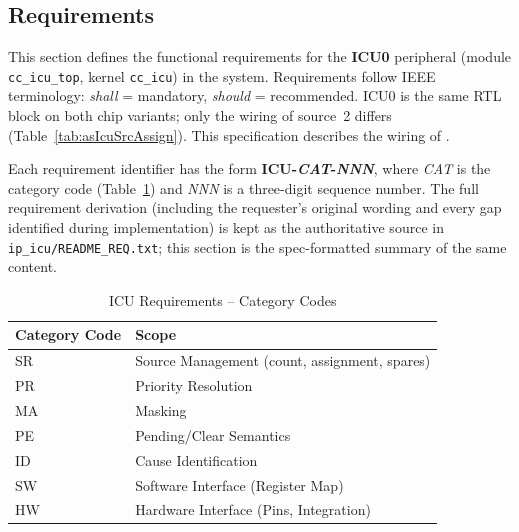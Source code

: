 
\label{sec:icufunc01}

\subsection{Requirements}
\label{subsec:icureq01}

This section defines the functional requirements for the \textbf{ICU0}
peripheral (module \texttt{cc\_icu\_top}, kernel \texttt{cc\_icu}) in the
\aschip{} system. Requirements follow IEEE terminology:
\textit{shall} = mandatory, \textit{should} = recommended.
ICU0 is the same RTL block on both chip variants; only the wiring of
source~2 differs (Table~\ref{tab:asIcuSrcAssign}). This specification
describes the wiring of \asvariant.

Each requirement identifier has the form \textbf{ICU-\textit{CAT}-\textit{NNN}},
where \textit{CAT} is the category code (Table~\ref{tab:asIcuReqCat}) and
\textit{NNN} is a three-digit sequence number. The full requirement
derivation (including the requester's original wording and every gap
identified during implementation) is kept as the authoritative source in
\texttt{ip\_icu/README\_REQ.txt}; this section is the spec-formatted
summary of the same content.

\begin{table}[H]
\caption{ICU Requirements -- Category Codes}
\label{tab:asIcuReqCat}
\centering
\begin{tabularx}{\textwidth}{|l |X|}
  \hline
  Category Code & Scope \\
  \hline
  \hline
  SR & Source Management (count, assignment, spares) \\
  \hline
  PR & Priority Resolution \\
  \hline
  MA & Masking \\
  \hline
  PE & Pending/Clear Semantics \\
  \hline
  ID & Cause Identification \\
  \hline
  SW & Software Interface (Register Map) \\
  \hline
  HW & Hardware Interface (Pins, Integration) \\
  \hline
\end{tabularx}
\end{table}

